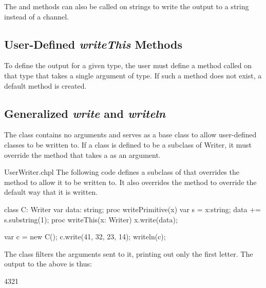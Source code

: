 The  and  methods can also be called on
strings to write the output to a string instead of a channel.




\subsection{User-Defined {\em writeThis} Methods}

To define the output for a given type, the user must define a method
called  on that type that takes a single argument of
 type.  If such a method does not exist, a default method is
created.




\subsection{Generalized {\em write} and {\em writeln}}
\label{writer}

The  class contains no arguments and serves as a base
class to allow user-defined classes to be written to.  If a class is
defined to be a subclass of Writer, it must override
the  method that takes a  as an argument.

\begin{chapelexample}{UserWriter.chpl}
The following code defines a subclass of  that overrides
the  method to allow it to be written to.  It also
overrides the  method to override the default way that
it is written.
\begin{chapel}
class C: Writer {
  var data: string;
  proc writePrimitive(x) {
    var s = x:string;
    data += s.substring(1);
  }
  proc writeThis(x: Writer) {
    x.write(data);
  }
}

var c = new C();
c.write(41, 32, 23, 14);
writeln(c);
\end{chapel}
The  class filters the arguments sent to it, printing out only
the first letter.  The output to the above is thus:
\begin{chapelprintoutput}
4321
\end{chapelprintoutput}
\end{chapelexample}


